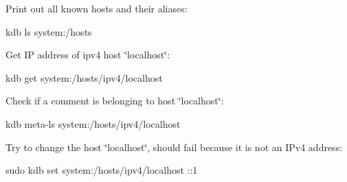 Print out all known hosts and their aliases\+:


\begin{DoxyCode}
kdb ls system:/hosts
\end{DoxyCode}


Get IP address of ipv4 host \char`\"{}localhost\char`\"{}\+:


\begin{DoxyCode}
kdb get system:/hosts/ipv4/localhost
\end{DoxyCode}


Check if a comment is belonging to host \char`\"{}localhost\char`\"{}\+:


\begin{DoxyCode}
kdb meta-ls system:/hosts/ipv4/localhost
\end{DoxyCode}


Try to change the host \char`\"{}localhost\char`\"{}, should fail because it is not an I\+Pv4 address\+:


\begin{DoxyCode}
sudo kdb set system:/hosts/ipv4/localhost ::1
\end{DoxyCode}


